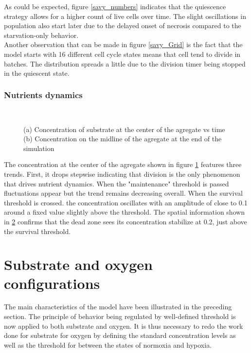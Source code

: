 \documentclass[11pt,a4paper]{article}
\begin{document}
As could be expected, figure \ref{savy_numbers} indicates that the quiescence strategy allows for a higher count of live cells over time. The slight oscillations in population also start later due to the delayed onset of necrosis compared to the starvation-only behavior.\\

Another observation that can be made in figure \ref{savy_Grid} is the fact that the model starts with 16 different cell cycle states means that cell tend to divide in batches. The distribution spreads a little due to the division timer being stopped in the quiescent state. \\

\subsubsection{Nutrients dynamics}
\begin{figure}[h]
\begin{subfigure}{0.5\textwidth}
	\centering
	
	\caption{ \label{savy_S_center}}
\end{subfigure}
~~
\begin{subfigure}{0.5\textwidth}
	\centering
	
	\caption{\label{S_savy_midline}}
\end{subfigure}
\caption{(a) Concentration of substrate at the center of the agregate vs time (b) Concentration on the midline of the agregate at the end of the simulation \label{savy_nutr}}
\end{figure}

The concentration at the center of the agregate shown in figure \ref{savy_S_center} features three trends. First, it drops stepwise indicating that division is the only phenomenon that drives nutrient dynamics. When the "maintenance" threshold is passed fluctuations appear but the trend remains decreasing overall. When the survival threshold is crossed. the concentration oscillates with an amplitude of close to 0.1 around a fixed value slightly above the threshold. The spatial information shown in \ref{S_savy_midline} confirms that the dead zone sees its concentration stabilize at 0.2, just above the survival threshold.\\



\newpage
\section{Substrate and oxygen configurations}
The main characteristics of the model have been illustrated in the preceding section. The principle of behavior being regulated by well-defined threshold is now applied to both substrate and oxygen. It is thus necessary to redo the work done for substrate for oxygen by defining the standard concentration levels as well as the threshold for between the states of normoxia and hypoxia.\\
\end{document}
